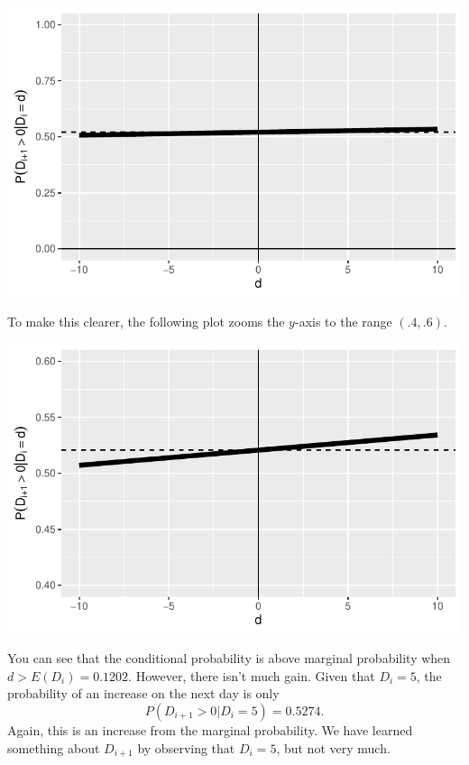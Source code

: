 \documentclass[
  letterpaper,
  DIV=11,
  numbers=noendperiod]{scrartcl}
\begin{document}
\begin{center}
\includegraphics{STAT2857A_examples_23_solutions_files/figure-pdf/unnamed-chunk-4-1.pdf}
\end{center}

To make this clearer, the following plot zooms the \(y\)-axis to the
range \((.4,.6)\).

\begin{center}
\includegraphics{STAT2857A_examples_23_solutions_files/figure-pdf/unnamed-chunk-5-1.pdf}
\end{center}

You can see that the conditional probability is above marginal
probability when \(d>E(D_i)=0.1202\). However, there isn't much gain.
Given that \(D_i=5\), the probability of an increase on the next day is
only \[
P(D_{i+1}>0|D_i=5)=0.5274.
\] Again, this is an increase from the marginal probability. We have
learned something about \(D_{i+1}\) by observing that \(D_{i}=5\), but
not very much.
\end{document}
